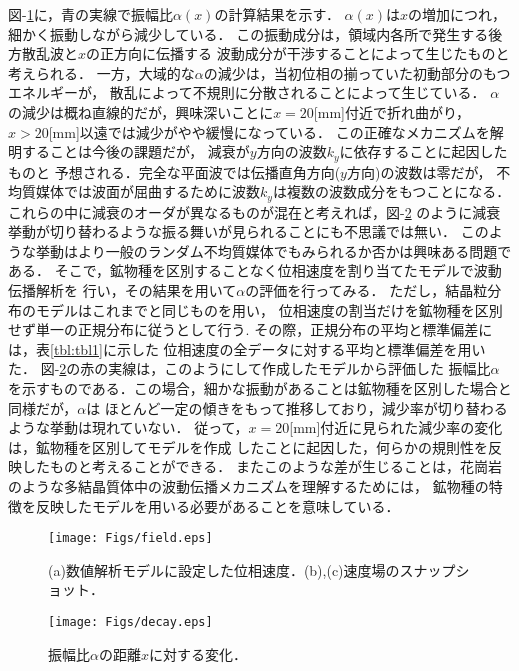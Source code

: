 図-\ref{fig:fig16}に，青の実線で振幅比$\alpha(x)$の計算結果を示す．
$\alpha(x)$は$x$の増加につれ，細かく振動しながら減少している．
この振動成分は，領域内各所で発生する後方散乱波と$x$の正方向に伝播する
波動成分が干渉することによって生じたものと考えられる．
一方，大域的な$\alpha$の減少は，当初位相の揃っていた初動部分のもつエネルギーが，
散乱によって不規則に分散されることによって生じている．
$\alpha$の減少は概ね直線的だが，興味深いことに$x=20$[mm]付近で折れ曲がり，
$x>20$[mm]以遠では減少がやや緩慢になっている．
この正確なメカニズムを解明することは今後の課題だが，
減衰が$y$方向の波数$k_y$に依存することに起因したものと
予想される．完全な平面波では伝播直角方向($y$方向)の波数は零だが，
不均質媒体では波面が屈曲するために波数$k_y$は複数の波数成分をもつことになる．
これらの中に減衰のオーダが異なるものが混在と考えれば，図-\ref{fig:fig17}
のように減衰挙動が切り替わるような振る舞いが見られることにも不思議では無い．
このような挙動はより一般のランダム不均質媒体でもみられるか否かは興味ある問題である．
そこで，鉱物種を区別することなく位相速度を割り当てたモデルで波動伝播解析を
行い，その結果を用いて$\alpha$の評価を行ってみる．
ただし，結晶粒分布のモデルはこれまでと同じものを用い，
位相速度の割当だけを鉱物種を区別せず単一の正規分布に従うとして行う.
その際，正規分布の平均と標準偏差には，表\ref{tbl:tbl1}に示した
位相速度の全データに対する平均と標準偏差を用いた．
図-\ref{fig:fig17}の赤の実線は，このようにして作成したモデルから評価した
振幅比$\alpha$を示すものである．この場合，細かな振動があることは鉱物種を区別した場合と同様だが，$\alpha$は
ほとんど一定の傾きをもって推移しており，減少率が切り替わるような挙動は現れていない．
従って，$x=20$[mm]付近に見られた減少率の変化は，鉱物種を区別してモデルを作成
したことに起因した，何らかの規則性を反映したものと考えることができる．
またこのような差が生じることは，花崗岩のような多結晶質体中の波動伝播メカニズムを理解するためには，
鉱物種の特徴を反映したモデルを用いる必要があることを意味している．
\begin{figure}
\begin{center}
	\texttt{[image: Figs/field.eps]}
	\caption{(a)数値解析モデルに設定した位相速度．(b),(c)速度場のスナップショット．}
	\label{fig:fig16}
\end{center}
\end{figure}
\begin{figure}
\begin{center}
	\texttt{[image: Figs/decay.eps]}
	\caption{振幅比$\alpha$の距離$x$に対する変化．}
	\label{fig:fig17}
\end{center}
\end{figure}
